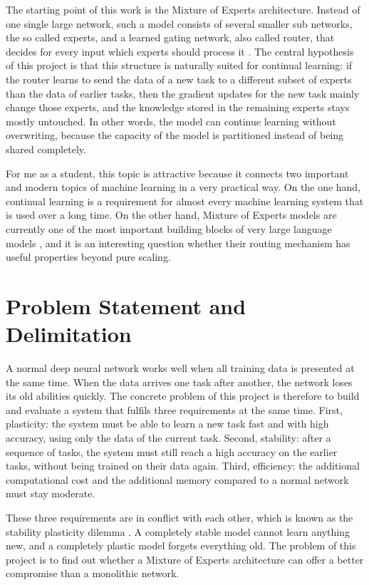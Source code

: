 The starting point of this work is the Mixture of Experts architecture.
Instead of one single large network, such a model consists of several
smaller sub networks, the so called experts, and a learned gating network,
also called router, that decides for every input which experts should
process it \cite{jacobs1991,shazeer2017}. The central hypothesis of this
project is that this structure is naturally suited for continual learning:
if the router learns to send the data of a new task to a different subset
of experts than the data of earlier tasks, then the gradient updates for
the new task mainly change those experts, and the knowledge stored in the
remaining experts stays mostly untouched. In other words, the model can
continue learning without overwriting, because the capacity of the model is
partitioned instead of being shared completely.

For me as a student, this topic is attractive because it connects two
important and modern topics of machine learning in a very practical way. On
the one hand, continual learning is a requirement for almost every machine
learning system that is used over a long time. On the other hand, Mixture
of Experts models are currently one of the most important building blocks
of very large language models \cite{fedus2022}, and it is an interesting
question whether their routing mechanism has useful properties beyond pure
scaling.

\section{Problem Statement and Delimitation}
\label{sec:problem}

A normal deep neural network works well when all training data is presented
at the same time. When the data arrives one task after another, the network
loses its old abilities quickly. The concrete problem of this project is
therefore to build and evaluate a system that fulfils three requirements at
the same time. First, plasticity: the system must be able to learn a new
task fast and with high accuracy, using only the data of the current task.
Second, stability: after a sequence of tasks, the system must still reach a
high accuracy on the earlier tasks, without being trained on their data
again. Third, efficiency: the additional computational cost and the
additional memory compared to a normal network must stay moderate.

These three requirements are in conflict with each other, which is known as
the stability plasticity dilemma \cite{mermillod2013}. A completely stable
model cannot learn anything new, and a completely plastic model forgets
everything old. The problem of this project is to find out whether a
Mixture of Experts architecture can offer a better compromise than a
monolithic network.

